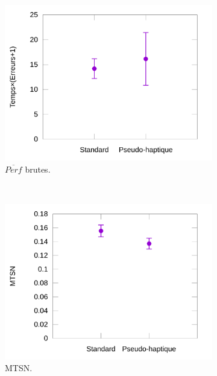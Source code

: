 \begin{figure}[!htb]
\begin{subfigure}[t]{0.49\textwidth}
			\includegraphics[width=\textwidth]{figures/ch5/phRawProducts}
			\caption{$\overline{Perf}$ brutes.}
			\label{fig:phRawProducts}
		\end{subfigure}
		~
		\begin{subfigure}[t]{0.49\textwidth}
			\centering
			\includegraphics[width=\textwidth]{figures/ch5/phNormTimes}
			\caption{MTSN.}
			\label{fig:phNormTimes}
		\end{subfigure}
				~
		\begin{subfigure}[t]{0.49\textwidth}
			\centering

\end{subfigure}
\end{figure}
